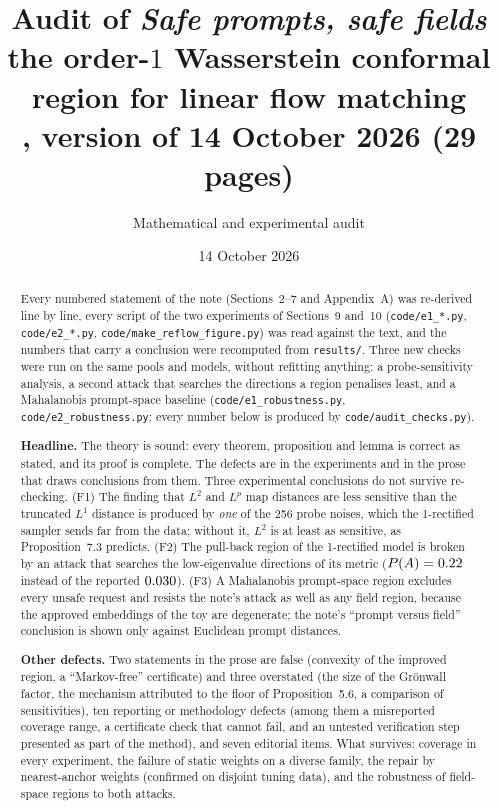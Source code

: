 \documentclass[11pt]{article}
\title{\vspace{-1.2cm}\textbf{Audit of \emph{Safe prompts, safe fields}}\\[2pt]
\large the order-$1$ Wasserstein conformal region for linear flow matching\\[6pt]
\normalsize \file{flow\_matching\_safe\_set\_POC/safe\_prompt\_fields.tex}, version of 14 October 2026 (29 pages)}
\author{\normalsize Mathematical and experimental audit}
\date{\normalsize 14 October 2026}
\newcommand{\file}[1]{\texttt{#1}}
\begin{document}
\maketitle
\thispagestyle{fancy}
\vspace{-0.6cm}

\begin{abstract}\noindent
Every numbered statement of the note (Sections~2--7 and Appendix~A) was re-derived line by line, every script of
the two experiments of Sections~9 and~10 (\file{code/e1\_*.py}, \file{code/e2\_*.py}, \file{code/make\_reflow\_figure.py})
was read against the text, and the numbers that carry a conclusion were recomputed from \file{results/}. Three new
checks were run on the same pools and models, without refitting anything: a probe-sensitivity analysis, a second
attack that searches the directions a region penalises least, and a Mahalanobis prompt-space baseline
(\file{code/e1\_robustness.py}, \file{code/e2\_robustness.py}; every number below is produced by
\file{code/audit\_checks.py}).
\smallskip

\noindent\textbf{Headline.} The theory is sound: every theorem, proposition and lemma is correct as stated, and its
proof is complete. The defects are in the experiments and in the prose that draws conclusions from them.
Three experimental conclusions do not survive re-checking. (F1) The finding that $L^2$ and $L^p$ map distances are less
sensitive than the truncated $L^1$ distance is produced by \emph{one} of the 256 probe noises, which the 1-rectified
sampler sends far from the data; without it, $L^2$ is at least as sensitive, as Proposition~7.3 predicts. (F2) The
pull-back region of the 1-rectified model is broken by an attack that searches the low-eigenvalue directions of its
metric ($P(A)=0.22$ instead of the reported $0.030$). (F3) A Mahalanobis prompt-space region excludes
every unsafe request and resists the note's attack as well as any field region, because the approved embeddings of the
toy are degenerate; the note's ``prompt versus field'' conclusion is shown only against Euclidean prompt distances.
\smallskip

\noindent\textbf{Other defects.} Two statements in the prose are false (convexity of the improved region, a ``Markov-free'' certificate) and
three overstated (the size of the Gr\"onwall factor, the mechanism attributed to the floor of Proposition~5.6, a
comparison of sensitivities), ten reporting or methodology defects (among them a misreported coverage range, a certificate check
that cannot fail, and an untested verification step presented as part of the method), and seven editorial items.
What survives: coverage in every experiment, the failure of static weights on a diverse family, the repair by
nearest-anchor weights (confirmed on disjoint tuning data), and the robustness of field-space regions to both attacks.
\end{abstract}
\end{document}

